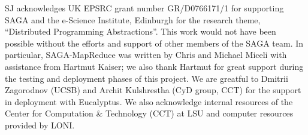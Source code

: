 \documentclass[conference,final]{IEEEtran}
\newcommand{\sagamapreduce }{SAGA-MapReduce }
\begin{document}
SJ acknowledges UK EPSRC grant number GR/D0766171/1 for supporting
SAGA and the e-Science Institute, Edinburgh for the research theme,
``Distributed Programming Abstractions''.  This work would not have
been possible without the efforts and support of other members of the
SAGA team.  In particular, \sagamapreduce was written by Chris and
Michael Miceli with assistance from Hartmut Kaiser; we also thank
Hartmut for great support during the testing and deployment phases of
this project. We are greatful to Dmitrii Zagorodnov (UCSB) and Archit
Kulshrestha (CyD group, CCT) for the support in deployment with
Eucalyptus.  We also acknowledge internal resources of the Center for
Computation \& Technology (CCT) at LSU and computer resources provided
by LONI.   
\end{document}
